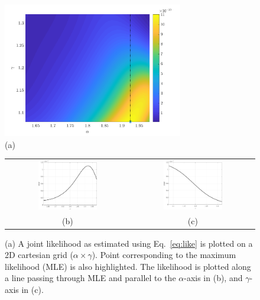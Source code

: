\begin{figure}[p]
 \begin{center}
  \includegraphics[width=0.70\textwidth]{./Figures/gl}
  \\ (a)
  \begin{tabular}{cc}
  \includegraphics[width=0.50\textwidth]{./Figures/pdf_alpha}
  &
  \includegraphics[width=0.50\textwidth]{./Figures/pdf_gamma}
  \\ (b) & (c)
  \end{tabular}
\caption{(a) A joint likelihood as estimated using Eq.~\ref{eq:like} is plotted on a 2D cartesian grid
 ($\alpha\times\gamma$). Point corresponding to the maximum likelihood (MLE) is also highlighted.
 The likelihood is plotted along a line passing through MLE and parallel to the $\alpha$-axis
 in (b), and $\gamma$-axis in (c).}
\label{fig:like}
\end{center}
\end{figure}

\clearpage







